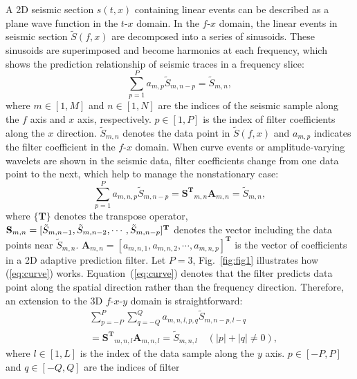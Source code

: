 A 2D seismic section $s(t,x)$ containing linear events can be
described as a plane wave function in the $t$-$x$ domain.  In the
$f$-$x$ domain, the linear events in seismic section $\tilde{S}(f,x)$
are decomposed into a series of sinusoids.  These sinusoids are
superimposed and become harmonics at each frequency, which shows the
prediction relationship of seismic traces in a frequency slice:
\begin{equation}
    \label{eq:plane}
    \sum_{p=1}^{P}a_{m,p}\tilde{S}_{m,n-p} = \tilde{S}_{m,n},
\end{equation}
where $m \in [1,M]$ and $n \in [1,N]$ are the indices of the seismic
sample along the $f$ axis and $x$ axis, respectively. $p \in [1,P]$ is
the index of filter coefficients along the $x$ direction.
$\tilde{S}_{m,n}$ denotes the data point in $\tilde{S}(f,x)$ and
$a_{m,p}$ indicates the filter coefficient in the $f$-$x$ domain. When
curve events or amplitude-varying wavelets are shown in the seismic
data, filter coefficients change from one data point to the next,
which help to manage the nonstationary case:
\begin{equation}
    \label{eq:curve}
    \sum_{p=1}^{P}a_{m,n,p}\tilde{S}_{m,n-p}
    = \mathbf{S^{T}}_{m,n} \mathbf{A}_{m,n}
    = \tilde{S}_{m,n},
\end{equation}
where $\{ \mathbf{T} \}$ denotes the transpose operator,
$\mathbf{S}_{m,n}=[\tilde{S}_{m,n-1}, \\
\tilde{S}_{m,n-2}, \cdots, \tilde{S}_{m,n-p}]^{\mathbf{T}}$ denotes
the vector including the data points near $\tilde{S}_{m,n}$.
$\mathbf{A}_{m,n}=[a_{m,n,1}, a_{m,n,2}, \cdots,
a_{m,n,p}]^{\mathbf{T}} $ is the vector of coefficients in a 2D
adaptive prediction filter. Let $P=3$, Fig.~\ref{fig:fig1} illustrates
how (\ref{eq:curve}) works.  Equation~(\ref{eq:curve}) denotes that
the filter predicts data point along the spatial direction rather than
the frequency direction. Therefore, an extension to the 3D $f$-$x$-$y$
domain is straightforward:
\begin{equation}
    \label{eq:curve3d}
    \begin{aligned}
         & \sum_{p=-P}^{P}\sum_{q=-Q}^{Q}a_{m,n,l,p,q}\tilde{S}_{m,n-p,l-q} \\
         & = \mathbf{S^{T}}_{m,n,l} \mathbf{A}_{m,n,l}
        = \tilde{S}_{m,n,l} \quad (|p|+|q| \neq 0),
    \end{aligned}
\end{equation}
where $l \in [1,L]$ is the index of the data sample along the $y$
axis. $p \in [-P,P]$ and $q \in [-Q,Q]$ are the indices of filter
